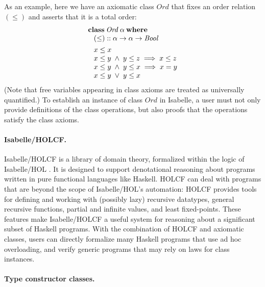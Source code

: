 \documentclass{sigplanconf}
\newcommand{\kwd}[1]{\mathbf{#1}}
\newcommand{\hsc}[1]{\ensuremath{\mathit{#1}}}
\newcommand{\tA}{\alpha}
\theoremstyle{definition}
\begin{document}
As an example, here we have an axiomatic class \hsc{Ord} that fixes an order relation $(\le)$ and asserts that it is a total order:
%
\begin{align*}
  & \kwd{class}\:\hsc{Ord}\:\tA\:\kwd{where} \\[-\jot]
  & \hspace{8pt} (\le)::\tA\to\tA\to\hsc{Bool} \\
  & \hspace{8pt}
  \begin{aligned}
  & %
  {x}\le{x} \\[-\jot]
  & %
  {x}\le{y}\;\wedge\; {y}\le{z}\implies{x}\le{z} \\[-\jot]
  & %
  {x}\le{y} \;\wedge\; {y}\le{x}\implies{x}={y} \\[-\jot]
  & %
  {x}\le{y} \;\vee\; {y}\le{x}
  \end{aligned}
\end{align*}
%
(Note that free variables appearing in class axioms are treated as universally quantified.) To establish an instance of class \hsc{Ord} in Isabelle, a user must not only provide definitions of the class operations, but also proofs that the operations satisfy the class axioms.

\paragraph{Isabelle/HOLCF.}

Isabelle/HOLCF is a library of domain theory, formalized within the logic of Isabelle/HOL \cite{holcf99,holcf11}. It is designed to support denotational reasoning about programs written in pure functional languages like Haskell. HOLCF can deal with programs that are beyond the scope of Isabelle/HOL's automation: HOLCF provides tools for defining and working with (possibly lazy) recursive datatypes, general recursive functions, partial and infinite values, and least fixed-points. These features make Isabelle/HOLCF a useful system for reasoning about a significant subset of Haskell programs. With the combination of HOLCF and axiomatic classes, users can directly formalize many Haskell programs that use ad hoc overloading, and verify generic programs that may rely on laws for class instances.

\paragraph{Type constructor classes.}
\end{document}
